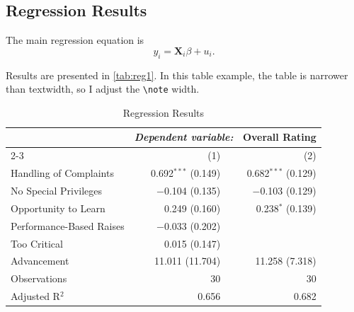 \documentclass[12pt]{article}
\begin{document}
\subsection{Regression Results}

The main regression equation is 
\begin{equation}
  y_i = \bm{X}_i \beta + u_i.
\end{equation}

Results are presented in \autoref{tab:reg1}. In this table example, the table is narrower than textwidth, so I adjust the \texttt{\textbackslash note} width. 

\begin{table}[h!]
  \caption{Regression Results}
  \label{tab:reg1}
  \begin{center}
    \begin{tabular}{@{} lrr @{}}
      \toprule
      & \multicolumn{2}{c}{\textit{Dependent variable:} \ Overall Rating} \\
      \cmidrule{2-3}
                                & (1)                   & (2)                   \\
      \hline

      Handling of Complaints   & 0.692$^{***}$ (0.149) & 0.682$^{***}$ (0.129) \\
      No Special Privileges    & $-$0.104 (0.135)      & $-$0.103 (0.129)      \\
      Opportunity to Learn     & 0.249 (0.160)         & 0.238$^{*}$ (0.139)   \\
      Performance-Based Raises & $-$0.033 (0.202)      &                       \\
      Too Critical             & 0.015 (0.147)         &                       \\
      Advancement              & 11.011 (11.704)       & 11.258 (7.318)        \\
      \hline
      Observations             & 30                    & 30                    \\
      Adjusted R$^{2}$         & 0.656                 & 0.682                 \\

      \bottomrule
    \end{tabular}

  \end{center}
\end{table}
\end{document}
